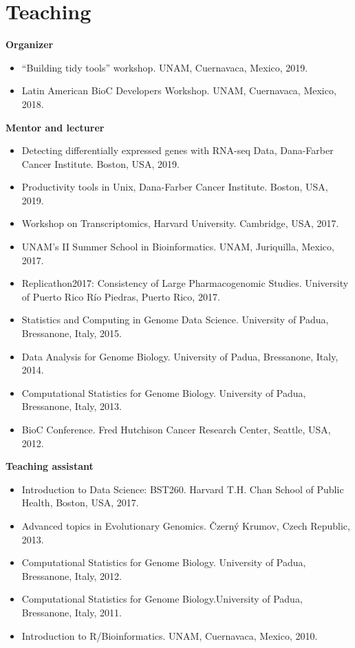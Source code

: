 \documentclass[11pt,a4paper,sans]{moderncv} %
\begin{document}
\vspace{-.2cm}
\section{Teaching}
\vspace{-.1cm}
\textbf{Organizer}
\begin{itemize}
\item ``Building tidy tools'' workshop. UNAM, Cuernavaca, Mexico, 2019.
\item Latin American BioC Developers Workshop. UNAM, Cuernavaca, Mexico, 2018.
\end{itemize}
\vspace{.1cm}
\textbf{Mentor and lecturer}
\begin{itemize}
\item Detecting differentially expressed genes with RNA-seq Data, Dana-Farber Cancer Institute. Boston, USA, 2019.
\item Productivity tools in Unix, Dana-Farber Cancer Institute. Boston, USA, 2019. 
\item Workshop on Transcriptomics, Harvard University. Cambridge, USA, 2017. 
\item UNAM's II Summer School in Bioinformatics. UNAM,  Juriquilla, Mexico, 2017. 
\item Replicathon2017: Consistency of Large Pharmacogenomic Studies. University of Puerto Rico Río Piedras, Puerto Rico, 2017.
\item Statistics and Computing in Genome Data Science. University of
  Padua, Bressanone, Italy, 2015.
\item Data Analysis for Genome Biology. University of Padua, Bressanone, Italy, 2014.
\item Computational Statistics for Genome Biology. University of
  Padua, Bressanone, Italy, 2013.
\item BioC Conference. Fred Hutchison Cancer Research Center, Seattle, USA, 2012.
\end{itemize}
\vspace{.1cm}
\textbf{Teaching assistant}
\begin{itemize}
\item Introduction to Data Science: BST260. Harvard T.H. Chan School of Public Health, Boston, USA, 2017. 
\item Advanced topics in Evolutionary Genomics. {\v C}zern\'y  Krumov, Czech Republic, 2013.
\item Computational Statistics for Genome Biology. University of Padua,
  Bressanone, Italy, 2012. 
\item Computational Statistics for Genome Biology.University of Padua,
  Bressanone, Italy, 2011. 
\item Introduction to R/Bioinformatics. UNAM, Cuernavaca, Mexico, 2010.
\end{itemize}
\end{document}
